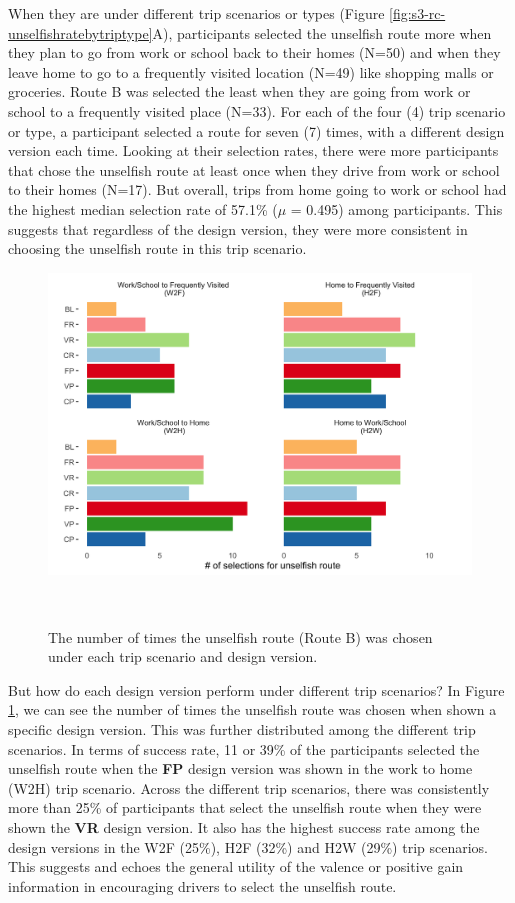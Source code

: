 When they are under different trip scenarios or types (Figure \ref{fig:s3-rc-unselfishratebytriptype}A), participants selected the unselfish route more when they plan to go from work or school back to their homes (N=50) and when they leave home to go to a frequently visited location (N=49) like shopping malls or groceries. Route B was selected the least when they are going from work or school to a frequently visited place (N=33). For each of the four (4) trip scenario or type, a participant selected a route for seven (7) times, with a different design version each time. Looking at their selection rates, there were more participants that chose the unselfish route at least once when they drive from work or school to their homes (N=17). But overall, trips from home going to work or school had the highest median selection rate of 57.1\% ($\mu$ =  0.495) among participants. This suggests that regardless of the design version, they were more consistent in choosing the unselfish route in this trip scenario. 

\begin{figure}[h]
\centering
  \includegraphics[scale=.2]{figures/s3-rc-unselfishinteract.png}
  \caption{The number of times the unselfish route (Route B) was chosen under each trip scenario and design version.}~\label{fig:s3-rc-unselfishinteract}
\end{figure}

But how do each design version perform under different trip scenarios? In Figure \ref{fig:s3-rc-unselfishinteract}, we can see the number of times the unselfish route was chosen when shown a specific design version. This was further distributed among the different trip scenarios. In terms of success rate, 11 or 39\% of the participants selected the unselfish route when the \textbf{FP} design version was shown in the work to home (W2H) trip scenario. Across the different trip scenarios, there was consistently more than 25\% of participants that select the unselfish route when they were shown the \textbf{VR} design version. It also has the highest success rate among the design versions in the W2F (25\%), H2F (32\%) and H2W (29\%) trip scenarios. This suggests and echoes the general utility of the valence or positive gain information in encouraging drivers to select the unselfish route. 

